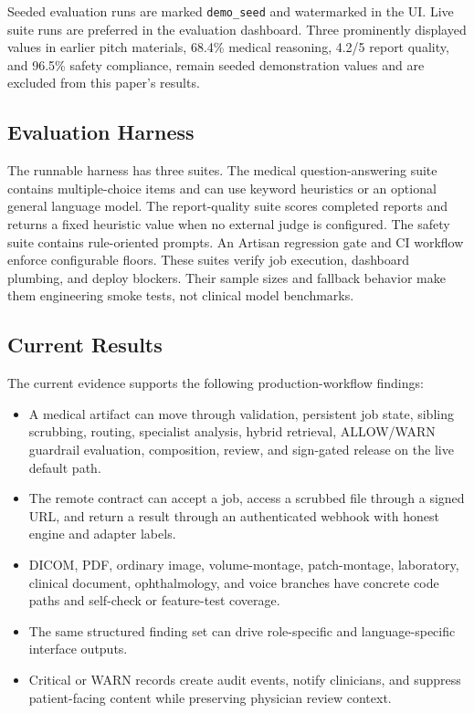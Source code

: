 \documentclass[conference]{IEEEtran}
\begin{document}
Seeded evaluation runs are marked \texttt{demo\_seed} and watermarked in the UI. Live suite runs are preferred in the evaluation dashboard. Three prominently displayed values in earlier pitch materials, 68.4\% medical reasoning, 4.2/5 report quality, and 96.5\% safety compliance, remain seeded demonstration values and are excluded from this paper's results.

\subsection{Evaluation Harness}

The runnable harness has three suites. The medical question-answering suite contains multiple-choice items and can use keyword heuristics or an optional general language model. The report-quality suite scores completed reports and returns a fixed heuristic value when no external judge is configured. The safety suite contains rule-oriented prompts. An Artisan regression gate and CI workflow enforce configurable floors. These suites verify job execution, dashboard plumbing, and deploy blockers. Their sample sizes and fallback behavior make them engineering smoke tests, not clinical model benchmarks.

\subsection{Current Results}

The current evidence supports the following production-workflow findings:

\begin{itemize}
    \item A medical artifact can move through validation, persistent job state, sibling scrubbing, routing, specialist analysis, hybrid retrieval, ALLOW/WARN guardrail evaluation, composition, review, and sign-gated release on the live default path.
    \item The remote contract can accept a job, access a scrubbed file through a signed URL, and return a result through an authenticated webhook with honest engine and adapter labels.
    \item DICOM, PDF, ordinary image, volume-montage, patch-montage, laboratory, clinical document, ophthalmology, and voice branches have concrete code paths and self-check or feature-test coverage.
    \item The same structured finding set can drive role-specific and language-specific interface outputs.
    \item Critical or WARN records create audit events, notify clinicians, and suppress patient-facing content while preserving physician review context.
\end{itemize}
\end{document}
